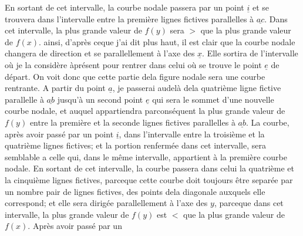 \documentclass[11pt,a4paper]{article}
\begin{document}
En sortant de cet intervalle, la courbe nodale passera par un point $\underline{i}$ et
se trouvera dans l'intervalle entre la première  lignes fictives parallelles
à $\underline{ac}$. Dans cet intervalle, la plus grande valeur de $f(y)$ sera
$>$ que la plus grande valeur de $f(x)$. ainsi, d'après ceque j'ai
dit plus haut, il est clair que la courbe nodale changera de
direction et se   parallellement à l'axe des $\underline{x}$. Elle
sortira de l'intervalle où je la considère àprésent pour rentrer
dans celui où se trouve le point $\underline{e}$ de départ. On voit donc
que cette partie dela figure nodale sera une courbe rentrante.
A partir du point $\underline{a}$, je passerai audelà dela quatrième ligne
fictive parallelle à $\underline{ab}$ jusqu'à un second point $\underline{e}$ qui sera le
sommet d'une nouvelle courbe nodale, et auquel appartiendra
parconséquent la plus grande valeur de $f(y)$ entre la première et la
seconde lignes fictives parallelles à $\underline{ab}$. La courbe, après avoir passé
par un point $\underline{i}$,   dans l'intervalle entre la troisième et la
quatrième lignes fictives; et la portion renfermée dans cet intervalle,
sera semblable a celle qui, dans le même intervalle, appartient
à la première courbe nodale. En sortant de cet intervalle, la courbe
 passera dans celui   la quatrième et la cinquième lignes fictives,
parceque cette courbe doit toujours être separée par un nombre
pair de lignes fictives, des points dela diagonale auxquels elle
correspond; et elle sera dirigée parallellement à l'axe des $y$, parceque
dans cet intervalle, la plus grande valeur de $f(y)$ est $<$ que
la plus grande valeur de $f(x)$. Après avoir passé par un
\end{document}

